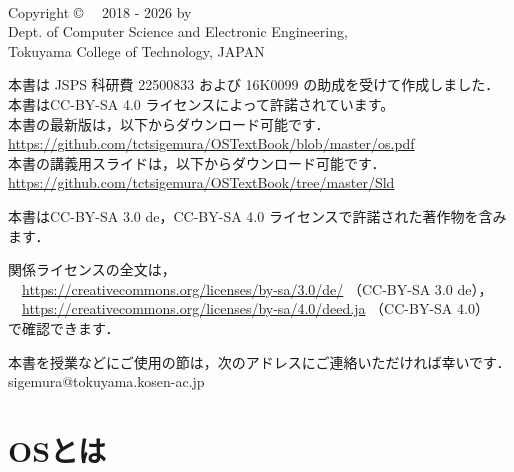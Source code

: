 \documentclass[a4paper,11pt,twocolumn]{ltjsbook}     %
\begin{document}
\thispagestyle{empty}
\onecolumn
~
\vfill
\begin{flushleft}
Copyright \copyright ~~ 2018 - 2026 by \\
Dept. of Computer Science and Electronic Engineering, \\
Tokuyama College of Technology, JAPAN
\end{flushleft}
\vspace{0.4cm}
\begin{flushleft}
本書は JSPS 科研費 22500833 および 16K0099 の助成を受けて作成しました．\\
本書はCC-BY-SA 4.0 ライセンスによって許諾されています。\\
本書の最新版は，以下からダウンロード可能です．\\
\url{https://github.com/tctsigemura/OSTextBook/blob/master/os.pdf}\\
本書の講義用スライドは，以下からダウンロード可能です．\\
\url{https://github.com/tctsigemura/OSTextBook/tree/master/Sld}
\end{flushleft}
\begin{flushleft}
本書はCC-BY-SA 3.0 de，CC-BY-SA 4.0 ライセンスで許諾された著作物を含みます．
\end{flushleft}
\begin{flushleft}
関係ライセンスの全文は，\\
　\url{https://creativecommons.org/licenses/by-sa/3.0/de/}
（CC-BY-SA 3.0 de），\\
　\url{https://creativecommons.org/licenses/by-sa/4.0/deed.ja}
（CC-BY-SA 4.0）\\
で確認できます．
\end{flushleft}
\begin{flushleft}
本書を授業などにご使用の節は，次のアドレスにご連絡いただければ幸いです．\\
sigemura@tokuyama.kosen-ac.jp
\end{flushleft}

\setcounter{tocdepth}{1}
\tableofcontents

\mainmatter

\part{OSとは}
\end{document}
